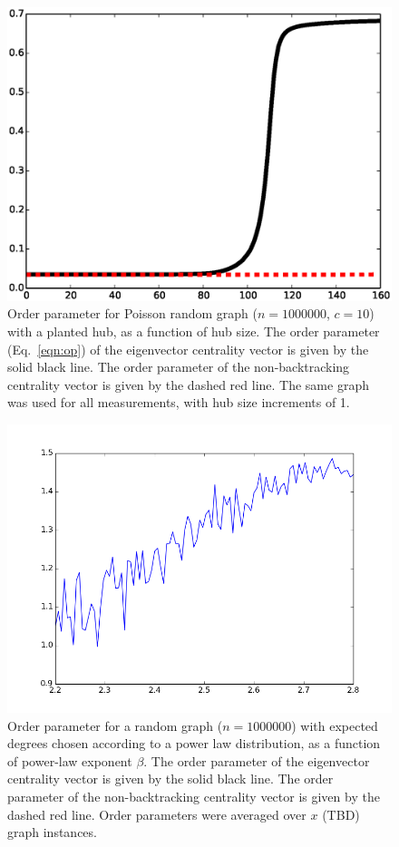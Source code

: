 \documentclass[twocolumn,prl,superscriptaddress]{revtex4}
\begin{document}
\begin{figure}
\begin{center}
\includegraphics[width=\columnwidth]{op.eps}
\end{center}
\caption{Order parameter for Poisson random graph ($n=1000000$, $c=10$) with a planted hub, as a function of hub size. The order parameter (Eq.~\eqref{eqn:op}) of the eigenvector centrality vector is given by the solid black line. The order parameter of the non-backtracking centrality vector is given by the dashed red line. The same graph was used for all measurements, with hub size increments of 1.}
\label{fig:order-parameter}
\end{figure}

\begin{figure}
\begin{center}
\includegraphics[width=\columnwidth]{power_plot.png}
\end{center}
\caption{Order parameter for a random graph ($n=1000000$) with expected degrees chosen according to a power law distribution, as a function of power-law exponent $\beta$. The order parameter of the eigenvector centrality vector is given by the solid black line. The order parameter of the non-backtracking centrality vector is given by the dashed red line. Order parameters were averaged over $x$ (TBD) graph instances.}
\label{fig:power-law}
\end{figure}


\end{document}
